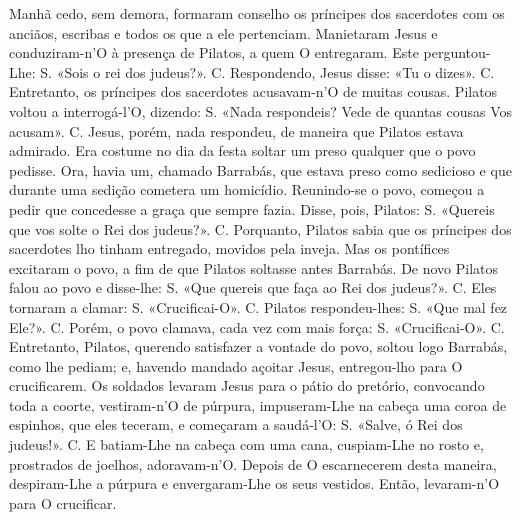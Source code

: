\begin{paracol}{2}
{Manhã cedo, sem demora, formaram conselho os príncipes dos sacerdotes com os anciãos, escribas e todos os que a ele pertenciam. Manietaram Jesus e conduziram-n’O à presença de Pilatos, a quem O entregaram. Este perguntou-Lhe: {\redx S.} «Sois o rei dos judeus?». {\redx C.} Respondendo, Jesus disse: \cruz «Tu o dizes». {\redx C.} Entretanto, os príncipes dos sacerdotes acusavam-n’O de muitas cousas. Pilatos voltou a interrogá-l’O, dizendo: {\redx S.} «Nada respondeis? Vede de quantas cousas Vos acusam». {\redx C.} Jesus, porém, nada respondeu, de maneira que Pilatos estava admirado. Era costume no dia da festa soltar um preso qualquer que o povo pedisse. Ora, havia um, chamado Barrabás, que estava preso como sedicioso e que durante uma sedição cometera um homicídio. Reunindo-se o povo, começou a pedir que concedesse a graça que sempre fazia. Disse, pois, Pilatos: {\redx S.} «Quereis que vos solte o Rei dos judeus?». {\redx C.} Porquanto, Pilatos sabia que os príncipes dos sacerdotes lho tinham entregado, movidos pela inveja. Mas os pontífices excitaram o povo, a fim de que Pilatos soltasse antes Barrabás. De novo Pilatos falou ao povo e disse-lhe: {\redx S.} «Que quereis que faça ao Rei dos judeus?». {\redx C.} Eles tornaram a clamar: {\redx S.} «Crucificai-O». {\redx C.} Pilatos respondeu-lhes: {\redx S.} «Que mal fez Ele?». {\redx C.} Porém, o povo clamava, cada vez com mais força: {\redx S.} «Crucificai-O». {\redx C.} Entretanto, Pilatos, querendo satisfazer a vontade do povo, soltou logo Barrabás, como lhe pediam; e, havendo mandado açoitar Jesus, entregou-lho para O crucificarem. Os soldados levaram Jesus para o pátio do pretório, convocando toda a coorte, vestiram-n’O de púrpura, impuseram-Lhe na cabeça uma coroa de espinhos, que eles teceram, e começaram a saudá-l’O: {\redx S.} «Salve, ó Rei dos judeus!». {\redx C.} E batiam-Lhe na cabeça com uma cana, cuspiam-Lhe no rosto e, prostrados de joelhos, adoravam-n’O. Depois de O escarnecerem desta maneira, despiram-Lhe a púrpura e envergaram-Lhe os seus vestidos. Então, levaram-n’O para O crucificar.
}\switchcolumn*{}
\end{paracol}
